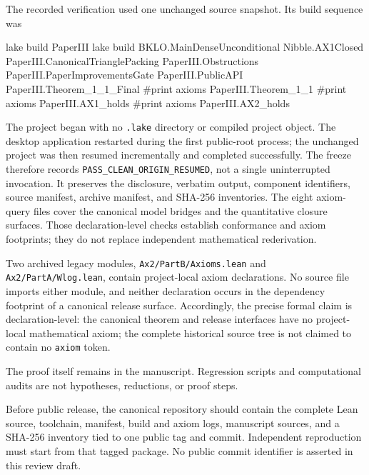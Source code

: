 \documentclass[
  american,
  11pt,
  a4paper,
]{article}
\newenvironment{Shaded}{}{}
\newcommand{\NormalTok}[1]{#1}
\begin{document}
The recorded verification used one unchanged source snapshot. Its build sequence was

\begin{Shaded}
\begin{Highlighting}[]
\NormalTok{lake build PaperIII}
\NormalTok{lake build BKLO.MainDenseUnconditional Nibble.AX1Closed PaperIII.CanonicalTrianglePacking PaperIII.Obstructions PaperIII.PaperImprovementsGate PaperIII.PublicAPI PaperIII.Theorem\_1\_1\_Final}
\NormalTok{\#print axioms PaperIII.Theorem\_1\_1}
\NormalTok{\#print axioms PaperIII.AX1\_holds}
\NormalTok{\#print axioms PaperIII.AX2\_holds}
\end{Highlighting}
\end{Shaded}

The project began with no \texttt{.lake} directory or compiled project object. The desktop application restarted during the first public-root process; the unchanged project was then resumed incrementally and completed successfully. The freeze therefore records \texttt{PASS\_CLEAN\_ORIGIN\_RESUMED}, not a single uninterrupted invocation. It preserves the disclosure, verbatim output, component identifiers, source manifest, archive manifest, and SHA-256 inventories. The eight axiom-query files cover the canonical model bridges and the quantitative closure surfaces. Those declaration-level checks establish conformance and axiom footprints; they do not replace independent mathematical rederivation.

Two archived legacy modules, \texttt{Ax2/PartB/Axioms.lean} and \texttt{Ax2/PartA/Wlog.lean}, contain project-local axiom declarations. No source file imports either module, and neither declaration occurs in the dependency footprint of a canonical release surface. Accordingly, the precise formal claim is declaration-level: the canonical theorem and release interfaces have no project-local mathematical axiom; the complete historical source tree is not claimed to contain no \texttt{axiom} token.

The proof itself remains in the manuscript. Regression scripts and computational audits are not hypotheses, reductions, or proof steps.

Before public release, the canonical repository should contain the complete Lean source, toolchain, manifest, build and axiom logs, manuscript sources, and a SHA-256 inventory tied to one public tag and commit. Independent reproduction must start from that tagged package. No public commit identifier is asserted in this review draft.
\end{document}

